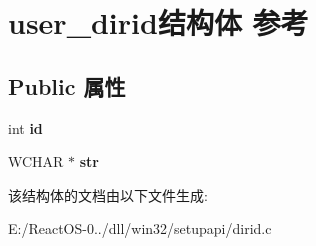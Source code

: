\hypertarget{structuser__dirid}{}\section{user\+\_\+dirid结构体 参考}
\label{structuser__dirid}
\subsection*{Public 属性}
\begin{DoxyCompactItemize}
\item 
\mbox{\label{structuser__dirid_a2dfcab7a0d3d5feb1b452dad1e05d1c3}} 
int {\bfseries id}
\item 
\mbox{\label{structuser__dirid_a6076d182f70be8a66922ae77eabd4198}} 
W\+C\+H\+AR $\ast$ {\bfseries str}
\end{DoxyCompactItemize}


该结构体的文档由以下文件生成\+:\begin{DoxyCompactItemize}
\item 
E\+:/\+React\+O\+S-\/0../dll/win32/setupapi/dirid.\+c\end{DoxyCompactItemize}
